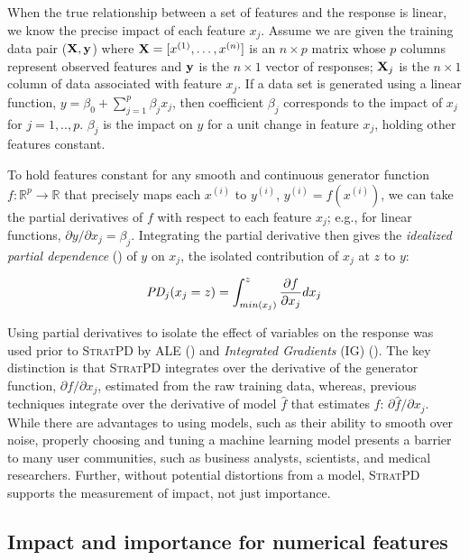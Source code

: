 \documentclass[smallextended]{svjour3}       %
\newcommand{\spd}{\fontfamily{cmr}\textsc{\small StratPD}}
\renewcommand{\xi}{x^{(i)}}
\begin{document}
When the true relationship between a set of features and the response is linear, we know the precise impact of each feature $x_j$. Assume we are given the training data pair ($\bf X, y$) where ${\bf X} = [x^{(1)}, \ldots, x^{(n)}]$ is an $n \times p$ matrix whose $p$ columns represent observed features and ${\bf y}$ is the $n \times 1$ vector of responses; ${\bf X}_j$ is the $n \times 1$ column of data associated with feature $x_j$.  If a data set is generated using a linear function, $y = \beta_0 + \sum_{j=1}^p \beta_j x_j$, then coefficient $\beta_j$ corresponds  to the impact of $x_j$ for $j=1,..,p$.  $\beta_j$ is the impact on $y$ for a unit change in feature $x_j$, holding other features constant.

To hold features constant for any smooth and continuous generator function $f:\mathbb{R}^{p} \rightarrow \mathbb{R}$ that precisely maps each $\xi$ to $y^{(i)}$, ${y^{(i)}} = f(\xi)$, we can take the partial derivatives of $f$ with respect to each feature $x_j$; e.g., for linear functions, ${\partial y}/{\partial x_j}=\beta_j$. Integrating the partial derivative then gives the {\em idealized partial dependence} (\citealt{stratpd}) of $y$ on $x_j$, the isolated contribution of $x_j$ at $z$ to $y$:

\begin{equation}\label{eq:pd}
\text{\it PD}_j(x_j = z) = \int_{min(x_j)}^z \frac{\partial f}{\partial x_j} dx_j
\end{equation}

Using partial derivatives to isolate the effect of variables on the response was used prior to \spd{} by ALE (\citealt{ALE}) and {\em Integrated Gradients} (IG) (\citealt{intgrad}). The key distinction is that  \spd{} integrates over the derivative of the generator function, ${\partial f}/{\partial x_j}$, estimated from the raw training data, whereas, previous techniques integrate over the derivative of model $\hat{f}$ that estimates $f$: ${\partial \hat{f}}/{\partial x_j}$. While there are advantages to using models, such as their ability to smooth over noise, properly choosing and tuning a machine learning model presents a barrier to many user communities, such as business analysts, scientists, and medical researchers. Further, without potential distortions from a model, \spd{} supports the measurement of impact, not just importance.

\subsection{Impact and importance for numerical features}
\end{document}
